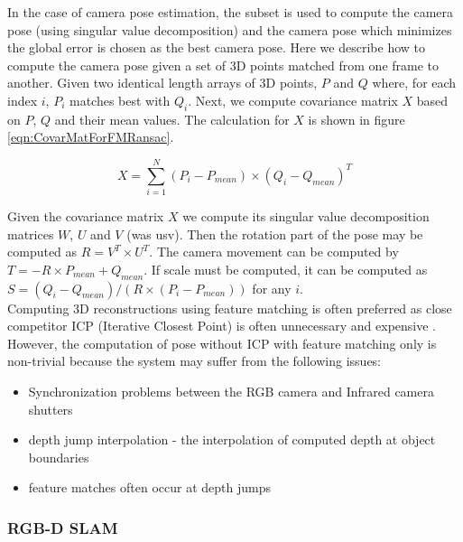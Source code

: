 In the case of camera pose estimation, the subset is used to compute the camera pose (using singular value decomposition) and the camera pose which minimizes the global error is chosen as the best camera pose. Here we describe how to compute the camera pose given a set of 3D points matched from one frame to another. Given two identical length arrays of 3D points, $P$ and $Q$ where, for each index $i$, $P_i$ matches best with $Q_i$. Next, we compute covariance matrix $X$ based on $P$, $Q$ and their mean values. The calculation for $X$ is shown in figure \ref{eqn:CovarMatForFMRansac}.


\begin{equation} \label{eqn:CovarMatForFMRansac}
X = \sum_{i=1}^{N} (P_i - P_{mean}) \times (Q_i - Q_{mean})^T
\end{equation}

Given the covariance matrix $X$ we compute its singular value decomposition matrices $W$, $U$ and $V$ (was usv). Then the rotation part of the pose may be computed as $R = V^T \times U^T$. The camera movement can be computed by $T = -R \times P_{mean} + Q_{mean}$. If scale must be computed, it can be computed as $S = (Q_i - Q_{mean}) / (R \times(P_i - P_{mean}))$ for any $i$. \\

Computing 3D reconstructions using feature matching is often preferred as close competitor ICP (Iterative Closest Point) is often unnecessary and expensive \cite{Endres12Evaluation}. However, the computation of pose without ICP with feature matching only is non-trivial because the system may suffer from the following issues:


\begin{itemize}
\item Synchronization problems between the RGB camera and Infrared camera shutters
\item depth jump interpolation - the interpolation of computed depth at object boundaries
\item feature matches often occur at depth jumps
\end{itemize}



\subsubsection{RGB-D SLAM}

